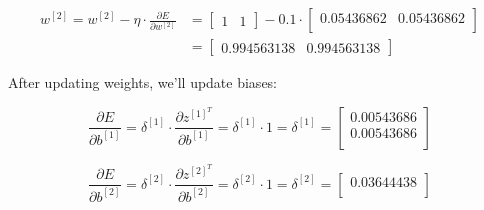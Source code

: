 \documentclass[12pt]{article}
\begin{document}
\begin{enumerate}[leftmargin=\labelsep]
        \begin{equation*}
          \begin{aligned}
            w^{[2]} = w^{[2]} - \eta \cdot \frac{\partial E}{\partial w^{[2]}}
             & = \begin{bmatrix}
                   1 & 1
                 \end{bmatrix} - 0.1 \cdot \begin{bmatrix}
                                             0.05436862 & 0.05436862 \\
                                           \end{bmatrix} \\
             & = \begin{bmatrix}
                   0.994563138 & 0.994563138
                 \end{bmatrix}
          \end{aligned}
        \end{equation*}

        After updating weights, we'll update biases:

        \begin{equation*}
          \frac{\partial E}{\partial b^{[1]}} = \delta^{[1]} \cdot
          \frac{\partial z^{[1]^T}}{\partial b^{[1]}}
          = \delta^{[1]} \cdot 1
          = \delta^{[1]}
          = \begin{bmatrix}
            0.00543686 \\
            0.00543686 \\
          \end{bmatrix}
        \end{equation*}

        \begin{equation*}
          \frac{\partial E}{\partial b^{[2]}} = \delta^{[2]} \cdot
          \frac{\partial z^{[2]^T}}{\partial b^{[2]}}
          = \delta^{[2]} \cdot 1
          = \delta^{[2]}
          = \begin{bmatrix}
            0.03644438 \\
          \end{bmatrix}
        \end{equation*}


\end{enumerate}
\end{document}
